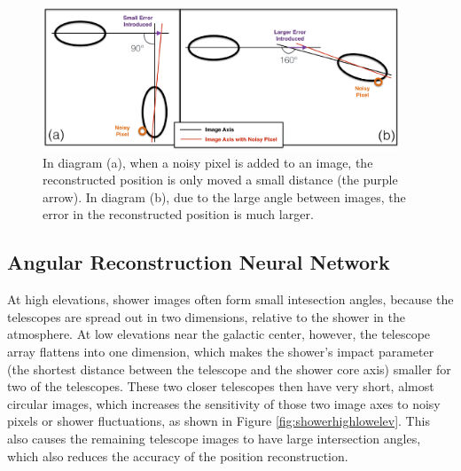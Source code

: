   \begin{figure}[ht]
    \begin{center}
      \includegraphics[width=0.95\textwidth]{images/large_angle_image_intersection_error_cropped.eps}
      \caption[Large Image Intersection Angles]{In diagram (a), when a noisy pixel is added to an image, the reconstructed position is only moved a small distance (the purple arrow).  In diagram (b), due to the large angle between images, the error in the reconstructed position is much larger.}\label{fig:largeintersectangle}
    \end{center}
  \end{figure}

  \subsection{Angular Reconstruction Neural Network}\label{subsec:disp}
    At high elevations, shower images often form small intesection angles, because the telescopes are spread out in two dimensions, relative to the shower in the atmosphere.
    At low elevations near the galactic center, however, the telescope array flattens into one dimension, which makes the shower's impact parameter (the shortest distance between the telescope and the shower core axis) smaller for two of the telescopes.
    These two closer telescopes then have very short, almost circular images, which increases the sensitivity of those two image axes to noisy pixels or shower fluctuations, as shown in Figure \ref{fig:showerhighlowelev}.
    This also causes the remaining telescope images to have large intersection angles, which also reduces the accuracy of the position reconstruction.

